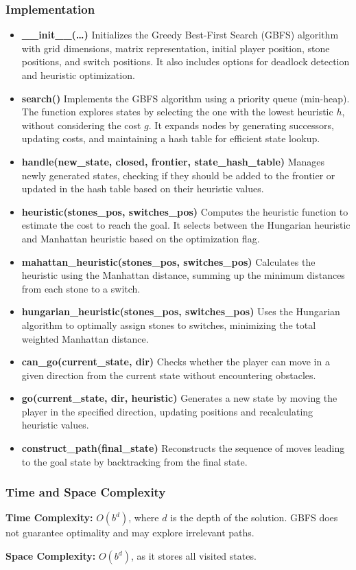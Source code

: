 \subsubsection{Implementation}
\begin{itemize}
	\item \textbf{\_\_init\_\_(\ldots)}
	      Initializes the Greedy Best-First Search (GBFS) algorithm with grid dimensions, matrix representation, initial player position, stone positions, and switch positions. It also includes options for deadlock detection and heuristic optimization.

	\item \textbf{search()}
	      Implements the GBFS algorithm using a priority queue (min-heap). The function explores states by selecting the one with the lowest heuristic \( h \), without considering the cost \( g \). It expands nodes by generating successors, updating costs, and maintaining a hash table for efficient state lookup.

	\item \textbf{handle(new\_state, closed, frontier, state\_hash\_table)}
	      Manages newly generated states, checking if they should be added to the frontier or updated in the hash table based on their heuristic values.

	\item \textbf{heuristic(stones\_pos, switches\_pos)}
	      Computes the heuristic function to estimate the cost to reach the goal. It selects between the Hungarian heuristic and Manhattan heuristic based on the optimization flag.

	\item \textbf{mahattan\_heuristic(stones\_pos, switches\_pos)}
	      Calculates the heuristic using the Manhattan distance, summing up the minimum distances from each stone to a switch.

	\item \textbf{hungarian\_heuristic(stones\_pos, switches\_pos)}
	      Uses the Hungarian algorithm to optimally assign stones to switches, minimizing the total weighted Manhattan distance.

	\item \textbf{can\_go(current\_state, dir)}
	      Checks whether the player can move in a given direction from the current state without encountering obstacles.

	\item \textbf{go(current\_state, dir, heuristic)}
	      Generates a new state by moving the player in the specified direction, updating positions and recalculating heuristic values.

	\item \textbf{construct\_path(final\_state)}
	      Reconstructs the sequence of moves leading to the goal state by backtracking from the final state.

\end{itemize}

\subsubsection{Time and Space Complexity}
\textbf{Time Complexity:} \( O(b^d) \), where \( d \) is the depth of the solution. GBFS does not guarantee optimality and may explore irrelevant paths.

\textbf{Space Complexity:} \( O(b^d) \), as it stores all visited states.

